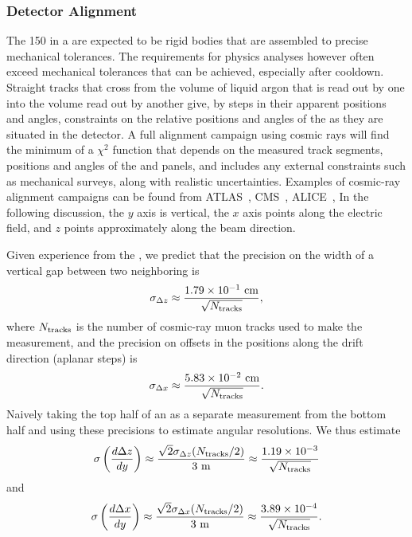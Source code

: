 \subsubsection{Detector Alignment}

The 150  in a  are expected to be rigid bodies that are assembled to
precise mechanical tolerances.  The requirements for physics analyses however often exceed 
mechanical tolerances that can be achieved, especially after cooldown.  Straight tracks that cross
from the volume of liquid argon that is read out by one  into the volume read out by another 
give, by steps in their apparent positions and angles, constraints on the relative positions and angles
of the  as they are situated in the detector.   A full alignment campaign using cosmic rays will
find the minimum of a $\chi^2$ function that depends on the measured track segments, positions and angles of
the  and   panels, and includes any external constraints such as mechanical surveys, along with
realistic uncertainties.  Examples of cosmic-ray alignment campaigns can be found from 
ATLAS~\cite{LacuestaMiquel:2015ksh,Moles-Valls:2014wza}, CMS~\cite{Chatrchyan:2009km}, ALICE~\cite{Aamodt:2010aa},
In the following discussion, the $y$ axis is vertical, the $x$ axis points along the electric field,
and $z$ points approximately along the beam direction.

Given experience from the , we predict
that the precision on the width of a vertical gap between two neighboring  is
\begin{equation}
\sigma_{\Delta z} \approx \frac{1.79\times 10^{-1}~{\rm{cm}}}{\sqrt{N_{\rm{tracks}}}},
\end{equation}
where $N_{\rm{tracks}}$ is the number of cosmic-ray muon tracks used to make the measurement,
and the precision on offsets in the  positions along the drift direction (aplanar steps) is
\begin{equation}
\sigma_{\Delta x} \approx \frac{5.83\times 10^{-2}~{\rm{cm}}}{\sqrt{N_{\rm{tracks}}}}.
\end{equation}
Naively taking the top half of an  as a separate measurement from the bottom half and using these
precisions to estimate angular resolutions.  We thus estimate
\begin{equation}
\sigma\left(\frac{d\Delta z}{dy}\right) \approx \frac{\sqrt{2}\sigma_{\Delta z}(N_{\rm{tracks}}/2)}{3~{\rm{m}}}
\approx
\frac{1.19\times 10^{-3}}{\sqrt{N_{\rm{tracks}}}}
\end{equation}
and
\begin{equation}
\sigma\left(\frac{d\Delta x}{dy}\right) \approx \frac{\sqrt{2}\sigma_{\Delta x}(N_{\rm{tracks}}/2)}{3~{\rm{m}}}
\approx
\frac{3.89\times 10^{-4}}{\sqrt{N_{\rm{tracks}}}}.
\end{equation}


